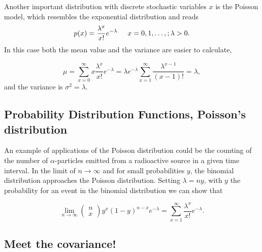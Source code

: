 \documentclass[%
oneside,                 %
final,                   %
10pt]{article}
\newenvironment{block_mdfboxadmon}[1][]{
\begin{block_mdfboxmdframed}[frametitle=#1]
}
{
\end{block_mdfboxmdframed}
}
\begin{document}
\begin{block_mdfboxadmon}[]

Another important distribution with discrete stochastic variables $x$ is  
the Poisson model, which resembles the exponential distribution and reads
\begin{equation*}
    p(x) = \frac{\lambda^x}{x!} e^{-\lambda} \hspace{0.5cm}x=0,1,\dots,;\lambda > 0.
\end{equation*}
In this case both the mean value and the variance are easier to calculate,

\begin{equation*}
\mu = \sum_{x=0}^{\infty} x \frac{\lambda^x}{x!} e^{-\lambda} = \lambda e^{-\lambda}\sum_{x=1}^{\infty}
\frac{\lambda^{x-1}}{(x-1)!}=\lambda,
\end{equation*}
and the variance is $\sigma^2=\lambda$.
\end{block_mdfboxadmon} %





\subsection{Probability Distribution Functions, Poisson's  distribution}

\begin{block_mdfboxadmon}[]
An example of applications of the Poisson distribution could be the counting
of the number of $\alpha$-particles emitted from a radioactive source in a given time interval.
In the limit of $n\rightarrow \infty$ and for small probabilities $y$, the binomial distribution
approaches the Poisson distribution. Setting $\lambda = ny$, with $y$ the probability for an event in
the binomial distribution we can show that

\begin{equation*} 
\lim_{n\rightarrow \infty}\left(\begin{array}{c} n \\ x\end{array}\right)y^x(1-y)^{n-x} e^{-\lambda}=\sum_{x=1}^{\infty}\frac{\lambda^x}{x!} e^{-\lambda}.
\end{equation*}
\end{block_mdfboxadmon} %



\subsection{Meet the  covariance!}
\end{document}
